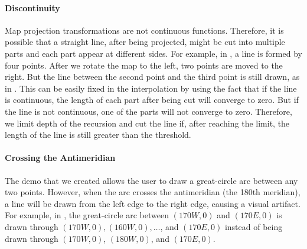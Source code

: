 \paragraph{Discontinuity}

Map projection transformations are not continuous functions. Therefore, it is possible that a straight line, after being projected, might be cut into multiple parts and each part appear at different sides. For example, in , a line is formed by four points. After we rotate the map to the left, two points are moved to the right. But the line between the second point and the third point is still drawn, as in . This can be easily fixed in the interpolation by using the fact that if the line is continuous, the length of each part after being cut will converge to zero. But if the line is not continuous, one of the parts will not converge to zero. Therefore, we limit depth of the recursion and cut the line if, after reaching the limit, the length of the line is still greater than the threshold.




\paragraph{Crossing the Antimeridian}


The demo that we created allows the user to draw a great-circle arc between any two points. However, when the arc crosses the antimeridian (the 180th meridian), a line will be drawn from the left edge to the right edge, causing a visual artifact. For example, in , the great-circle arc between $(170W, 0)$ and $(170E, 0)$ is drawn through  $(170W, 0), (160W, 0), \dots$, and $(170E, 0)$ instead of being drawn through $(170W, 0)$, $(180W, 0)$, and $(170E, 0)$.



